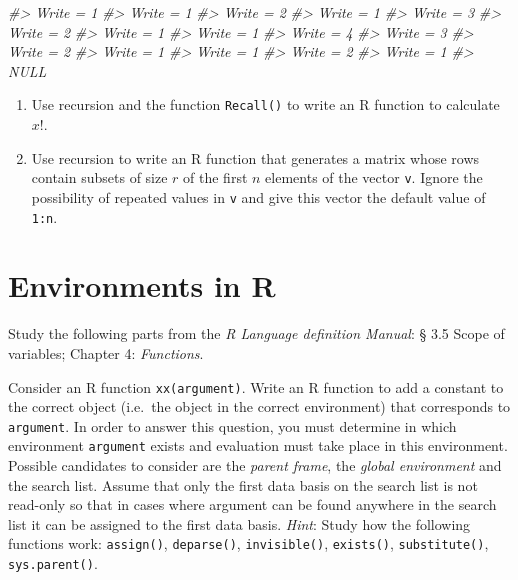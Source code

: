 \documentclass[
]{book}
\newenvironment{Shaded}{\begin{snugshade}}{\end{snugshade}}
\newcommand{\CommentTok}[1]{\textcolor[rgb]{0.56,0.35,0.01}{\textit{#1}}}
\begin{document}
\begin{Shaded}
\begin{Highlighting}[]
\CommentTok{\#\textgreater{} Write =  1 }
\CommentTok{\#\textgreater{} Write =  1 }
\CommentTok{\#\textgreater{} Write =  2 }
\CommentTok{\#\textgreater{} Write =  1 }
\CommentTok{\#\textgreater{} Write =  3 }
\CommentTok{\#\textgreater{} Write =  2 }
\CommentTok{\#\textgreater{} Write =  1 }
\CommentTok{\#\textgreater{} Write =  1 }
\CommentTok{\#\textgreater{} Write =  4 }
\CommentTok{\#\textgreater{} Write =  3 }
\CommentTok{\#\textgreater{} Write =  2 }
\CommentTok{\#\textgreater{} Write =  1 }
\CommentTok{\#\textgreater{} Write =  1 }
\CommentTok{\#\textgreater{} Write =  2 }
\CommentTok{\#\textgreater{} Write =  1}
\CommentTok{\#\textgreater{} NULL}
\end{Highlighting}
\end{Shaded}

\begin{enumerate}
\def\labelenumi{(\alph{enumi})}
\setcounter{enumi}{2}
\item
  Use recursion and the function \texttt{Recall()} to write an R function to calculate \(x!\).
\item
  Use recursion to write an R function that generates a matrix whose rows contain subsets of size \(r\) of the first \(n\) elements of the vector \texttt{v}. Ignore the possibility of repeated values in \texttt{v} and give this vector the default value of \texttt{1:n}.
\end{enumerate}

\section{Environments in R}\label{environments-in-r}

Study the following parts from the \emph{R Language definition Manual}: § 3.5 Scope of variables; Chapter 4: \emph{Functions}.

Consider an R function \texttt{xx(argument)}. Write an R function to add a constant to the correct object (i.e.~the object in the correct environment) that corresponds to \texttt{argument}. In order to answer this question, you must determine in which environment \texttt{argument} exists and evaluation must take place in this environment. Possible candidates to consider are the \emph{{parent frame}}, the \emph{{global environment}} and the search list. Assume that only the first data basis on the search list is not read-only so that in cases where argument can be found anywhere in the search list it can be assigned to the first data basis. \emph{Hint}: Study how the following functions work: \texttt{assign()}, \texttt{deparse()}, \texttt{invisible()}, \texttt{exists()}, \texttt{substitute()}, \texttt{sys.parent()}.
\end{document}
